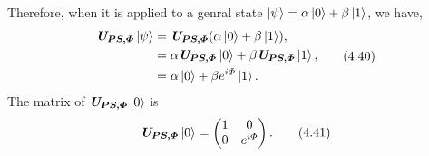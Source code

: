 \documentclass{article}
\begin{document}
Therefore, when it is applied to a genral state $\ket{\psi}=\alpha\ket{0}+\beta\ket{1}$,
we have,
\begin{align} \label{eq 4.40}
    \begin{split}
         \textit{\textbf{U}}_{\boldsymbol{PS,\varPhi}}\ket{\psi}&=  \textit{\textbf{U}}_{\boldsymbol{PS,\varPhi}}(\alpha\ket{0}+\beta\ket{1}),\\
         &=\alpha \textit{\textbf{U}}_{\boldsymbol{PS,\varPhi}}\ket{0}+\beta \textit{\textbf{U}}_{\boldsymbol{PS,\varPhi}}\ket{1},\\
         &=\alpha\ket{0}+\beta e^{i \varPhi}\ket{1}.
    \end{split}\tag{4.40}
\end{align}
The matrix of  $\textit{\textbf{U}}_{\boldsymbol{PS,\varPhi}}\ket{0}$ is
\begin{equation} \label{eq 4.41}
     \textit{\textbf{U}}_{\boldsymbol{PS,\varPhi}}\ket{0}=\begin{pmatrix}
        1& 0\\0& e^{i\varPhi}
     \end{pmatrix}.\tag{4.41}
\end{equation}
\end{document}
